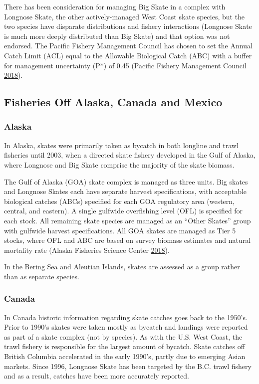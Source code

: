 \documentclass[12pt,]{article}
\begin{document}
There has been consideration for managing Big Skate in a complex with
Longnose Skate, the other actively-managed West Coast skate species, but
the two species have disparate distributions and fishery interactions
(Longnose Skate is much more deeply distributed than Big Skate) and that
option was not endorsed. The Pacific Fishery Management Council has
chosen to set the Annual Catch Limit (ACL) equal to the Allowable
Biological Catch (ABC) with a buffer for management uncertainty (P*) of
0.45 (Pacific Fishery Management Council
\protect\hyperlink{ref-PFMC2018}{2018}).

\hypertarget{fisheries-off-alaska-canada-and-mexico}{%
\subsection{Fisheries Off Alaska, Canada and
Mexico}\label{fisheries-off-alaska-canada-and-mexico}}

\hypertarget{alaska}{%
\subsubsection{Alaska}\label{alaska}}

In Alaska, skates were primarily taken as bycatch in both longline and
trawl fisheries until 2003, when a directed skate fishery developed in
the Gulf of Alaska, where Longnose and Big Skate comprise the majority
of the skate biomass.

The Gulf of Alaska (GOA) skate complex is managed as three units. Big
skates and Longnose Skates each have separate harvest specifications,
with acceptable biological catches (ABCs) specified for each GOA
regulatory area (western, central, and eastern). A single gulfwide
overfishing level (OFL) is specified for each stock. All remaining skate
species are managed as an ``Other Skates'' group with gulfwide harvest
specifications. All GOA skates are managed as Tier 5 stocks, where OFL
and ABC are based on survey biomass estimates and natural mortality rate
(Alaska Fisheries Science Center
\protect\hyperlink{ref-AFSC2018}{2018}).

In the Bering Sea and Aleutian Islands, skates are assessed as a group
rather than as separate species.

\hypertarget{canada}{%
\subsubsection{Canada}\label{canada}}

In Canada historic information regarding skate catches goes back to the
1950's. Prior to 1990's skates were taken mostly as bycatch and landings
were reported as part of a skate complex (not by species). As with the
U.S. West Coast, the trawl fishery is responsible for the largest amount
of bycatch. Skate catches off British Columbia accelerated in the early
1990's, partly due to emerging Asian markets. Since 1996, Longnose Skate
has been targeted by the B.C. trawl fishery and as a result, catches
have been more accurately reported.
\end{document}

